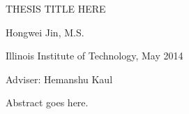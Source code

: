 \documentclass{article}
\begin{document}
\MakeUppercase{Thesis Title here}

Hongwei Jin, M.S.

Illinois Institute of Technology, May 2014

Adviser: Hemanshu Kaul

Abstract goes here.
\end{document}
